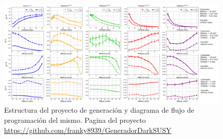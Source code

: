 \begin{landscape}
\begin{figure}[ht]
\centering
\includegraphics[width=1.3\textwidth]{Simulacion/imagenes/Comparacion_Distribucion_Entries.png}
\caption{Estructura del proyecto de generación y diagrama de flujo de programación del mismo. Pagina del proyecto \url{https://github.com/franky8939/GeneradorDarkSUSY}}
\label{entradas3}
\end{figure}
\end{landscape} 





